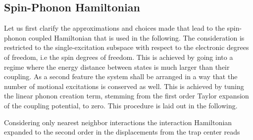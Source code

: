 \subsection*{Spin-Phonon Hamiltonian}
Let us first clarify the approximations and choices made that lead to the spin-phonon coupled Hamiltonian that is used in the following. The consideration is restricted to the single-excitation subspace with respect to the electronic degrees of freedom, i.e the spin degrees of freedom. This is achieved by going into a regime where the energy distance between states is much larger than their coupling. As a second feature the system shall be arranged in a way that the number of motional excitations is conserved as well. This is achieved by tuning the linear phonon creation term, stemming from the first order Taylor expansion of the coupling potential, to zero. This procedure is laid out in the following.

Considering only nearest neighbor interactions the interaction Hamiltonian expanded to the second order in the displacements from the trap center reads

